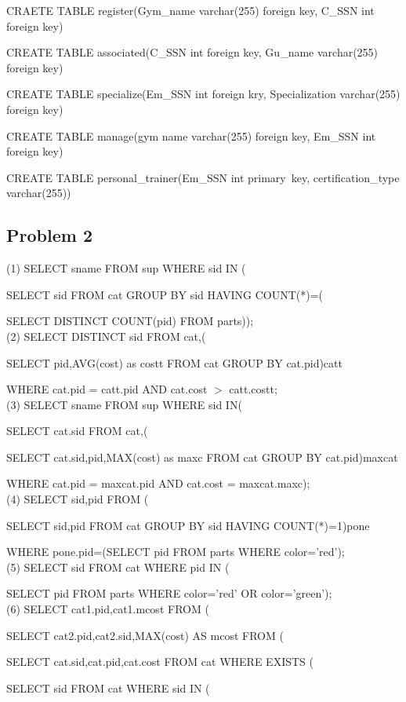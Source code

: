\documentclass{article}
\begin{document}
    CRAETE TABLE register(Gym\_name varchar(255) foreign key, C\_SSN int foreign key)

    CREATE TABLE associated(C\_SSN int foreign key, Gu\_name varchar(255) foreign key)

    CREATE TABLE specialize(Em\_SSN int foreign kry, Specialization varchar(255) foreign key)

    CREATE TABLE manage(gym name varchar(255) foreign key, Em\_SSN int foreign key)

    CREATE TABLE personal\_trainer(Em\_SSN int primary\ key, certification\_type varchar(255))

    \subsection*{Problem 2}
    (1) SELECT sname FROM sup WHERE sid IN (

        SELECT sid FROM cat GROUP BY sid HAVING COUNT(*)=(
        
        SELECT DISTINCT COUNT(pid) FROM parts));\\
    (2) SELECT DISTINCT sid FROM cat,(

        SELECT pid,AVG(cost) as costt FROM cat GROUP BY cat.pid)catt

        WHERE cat.pid = catt.pid AND cat.cost $>$ catt.costt;\\
    (3) SELECT sname FROM sup WHERE sid IN(

        SELECT cat.sid FROM cat,(

        SELECT cat.sid,pid,MAX(cost) as maxc FROM cat GROUP BY cat.pid)maxcat

        WHERE cat.pid = maxcat.pid AND cat.cost = maxcat.maxc);\\
    (4) SELECT sid,pid FROM (

        SELECT sid,pid FROM cat GROUP BY sid HAVING COUNT(*)=1)pone 

        WHERE pone.pid=(SELECT pid FROM parts WHERE color='red');\\
    (5) SELECT sid FROM cat WHERE pid IN (

        SELECT pid FROM parts WHERE color='red' OR color='green');\\
    (6) SELECT cat1.pid,cat1.mcost FROM (

        SELECT cat2.pid,cat2.sid,MAX(cost) AS mcost FROM (

        SELECT cat.sid,cat.pid,cat.cost FROM cat WHERE EXISTS (

        SELECT sid FROM cat WHERE sid IN (
\end{document}
